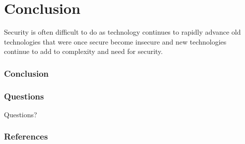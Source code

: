 \documentclass{beamer}
\begin{document}
\section{Conclusion}
	\begin{frame}
		Security is often difficult to do as technology continues to rapidly advance old technologies that were once secure become insecure and new technologies continue to add to complexity and need for security.
		\frametitle{Conclusion}
		\end{frame}	
		
		\begin{frame}
		\frametitle{Questions}
			\begin{center}
			\Huge Questions?
			\end{center}
		\end{frame}	
		\begin{frame}
		\frametitle{References}
		\end{frame}
\end{document}

